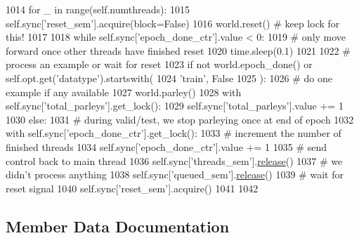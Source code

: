 \begin{DoxyCode}
1014                             \textcolor{keywordflow}{for} \_ \textcolor{keywordflow}{in} range(self.numthreads):
1015                                 self.sync[\textcolor{stringliteral}{'reset\_sem'}].acquire(block=\textcolor{keyword}{False})
1016                         world.reset()  \textcolor{comment}{# keep lock for this!}
1017 
1018                 \textcolor{keywordflow}{while} self.sync[\textcolor{stringliteral}{'epoch\_done\_ctr'}].value < 0:
1019                     \textcolor{comment}{# only move forward once other threads have finished reset}
1020                     time.sleep(0.1)
1021 
1022                 \textcolor{comment}{# process an example or wait for reset}
1023                 \textcolor{keywordflow}{if} \textcolor{keywordflow}{not} world.epoch\_done() \textcolor{keywordflow}{or} self.opt.get(\textcolor{stringliteral}{'datatype'}).startswith(
1024                     \textcolor{stringliteral}{'train'}, \textcolor{keyword}{False}
1025                 ):
1026                     \textcolor{comment}{# do one example if any available}
1027                     world.parley()
1028                     with self.sync[\textcolor{stringliteral}{'total\_parleys'}].get\_lock():
1029                         self.sync[\textcolor{stringliteral}{'total\_parleys'}].value += 1
1030                 \textcolor{keywordflow}{else}:
1031                     \textcolor{comment}{# during valid/test, we stop parleying once at end of epoch}
1032                     with self.sync[\textcolor{stringliteral}{'epoch\_done\_ctr'}].get\_lock():
1033                         \textcolor{comment}{# increment the number of finished threads}
1034                         self.sync[\textcolor{stringliteral}{'epoch\_done\_ctr'}].value += 1
1035                     \textcolor{comment}{# send control back to main thread}
1036                     self.sync[\textcolor{stringliteral}{'threads\_sem'}].\hyperlink{namespaceconf_a325dc746d8bf05c54d26351c35a21d90}{release}()
1037                     \textcolor{comment}{# we didn't process anything}
1038                     self.sync[\textcolor{stringliteral}{'queued\_sem'}].\hyperlink{namespaceconf_a325dc746d8bf05c54d26351c35a21d90}{release}()
1039                     \textcolor{comment}{# wait for reset signal}
1040                     self.sync[\textcolor{stringliteral}{'reset\_sem'}].acquire()
1041 
1042 
\end{DoxyCode}


\subsection{Member Data Documentation}
\mbox{\label{classparlai_1_1core_1_1worlds_1_1HogwildProcess_a4266e7c47686cd9b4fa9d62ae84375c8}} 
